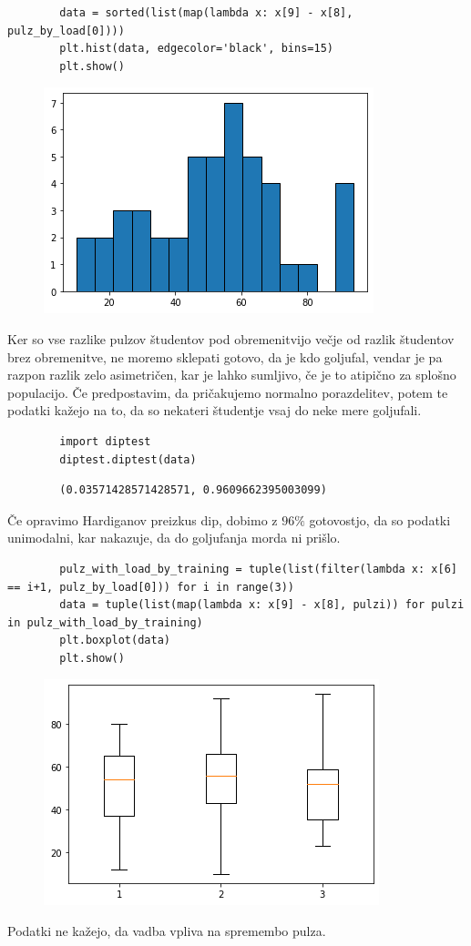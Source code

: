 \documentclass[a4paper]{article}
\begin{document}
\begin{homeworkProblem}
    \pagebreak
    \solution
    \begin{verbatim}
        data = sorted(list(map(lambda x: x[9] - x[8], pulz_by_load[0])))
        plt.hist(data, edgecolor='black', bins=15)
        plt.show()
    \end{verbatim}
    \begin{figure}[h!]
        \includegraphics{fig-3-2.png}
    \end{figure}
    Ker so vse razlike pulzov študentov pod obremenitvijo večje od razlik študentov brez obremenitve, ne moremo sklepati gotovo, da je kdo goljufal,
    vendar je pa razpon razlik zelo asimetričen, kar je lahko sumljivo, če je to atipično za splošno populacijo. Če predpostavim, da pričakujemo normalno porazdelitev, potem te podatki kažejo na to, da so nekateri študentje vsaj do neke mere goljufali.
    \begin{verbatim}
        import diptest
        diptest.diptest(data)
    \end{verbatim}
    \begin{verbatim}
        (0.03571428571428571, 0.9609662395003099)
    \end{verbatim}
    Če opravimo Hardiganov preizkus dip, dobimo z \(96\%\) gotovostjo, da so podatki unimodalni, kar nakazuje, da do goljufanja morda ni prišlo.


    \pagebreak
    \solution
    \begin{verbatim}
        pulz_with_load_by_training = tuple(list(filter(lambda x: x[6] == i+1, pulz_by_load[0])) for i in range(3))
        data = tuple(list(map(lambda x: x[9] - x[8], pulzi)) for pulzi in pulz_with_load_by_training)
        plt.boxplot(data)
        plt.show()
    \end{verbatim}
    \begin{figure}[h!]
        \includegraphics{fig-3-3.png}
    \end{figure}

    Podatki ne kažejo, da vadba vpliva na spremembo pulza.
\end{homeworkProblem}
\end{document}
